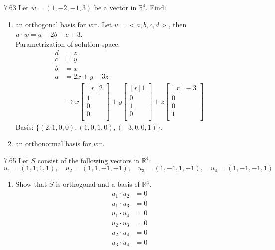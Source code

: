 \documentclass[12pt]{article}
\theoremstyle{definition}
\theoremstyle{plain}
\begin{document}
\begin{enumerate}
\item[7.63]Let $w=(1,-2,-1,3)$ be a vector in $\mathbb{R}^4$. Find:
	\begin{enumerate}
	\item an orthogonal basis for $w^\perp$.
		Let $u=<a,b,c,d>$, then $u\cdot w = a-2b-c+3$.\\
		Parametrization of solution space:
		\begin{align*}
		d&=z\\
		c&=y\\
		b&=x\\
		a&=2x+y-3z\\
		&\rightarrow x\begin{bmatrix}[r]2\\1\\0\\0\\\end{bmatrix}+y\begin{bmatrix}[r]1\\0\\1\\0\\\end{bmatrix}+z\begin{bmatrix}[r]-3\\0\\0\\1\\\end{bmatrix}
		\end{align*}
		Basis: $\{(2,1,0,0),(1,0,1,0),(-3,0,0,1)\}$.
	\item an orthonormal basis for $w^\perp$.
	\end{enumerate}
\pagebreak
\item[7.65]Let $S$ consist of the following vectors in $\mathbb{R}^4$:
\[ u_1=(1,1,1,1), \quad u_2=(1,1,-1,-1), \quad u_3=(1,-1,1,-1), \quad u_4=(1,-1,-1,1) \]
	\begin{enumerate}
	\item Show that $S$ is orthogonal and a basis of $\mathbb{R}^4$.\\
		\begin{align*}
		u_1\cdot u_2&=0\\
		u_1\cdot u_3 &= 0\\
		u_1\cdot u_4 &= 0\\
		u_2\cdot u_3 &= 0\\
		u_2\cdot u_4 &= 0\\
		u_3\cdot u_4&= 0
		\end{align*}

\end{enumerate}
\end{enumerate}
\end{document}
